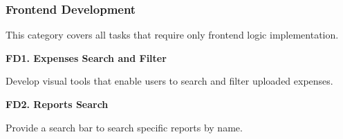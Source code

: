 \subsubsection{Frontend Development}

This category covers all tasks that require only frontend logic implementation.

\textbf{FD1. Expenses Search and Filter}

Develop visual tools that enable users to search and filter uploaded expenses.

\textbf{FD2. Reports Search}

Provide a search bar to search specific reports by name.
